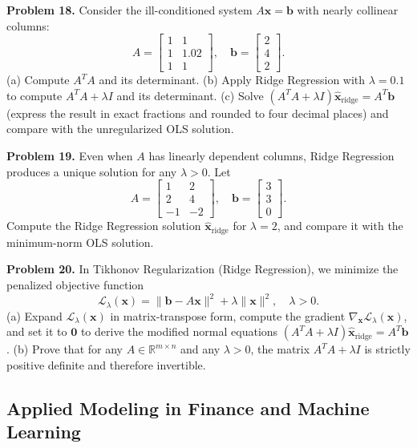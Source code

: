 \documentclass[11pt, letterpaper]{article}
\theoremstyle{definition}
\theoremstyle{remark}
\begin{document}
\textbf{Problem 18.} Consider the ill-conditioned system $A\mathbf{x} = \mathbf{b}$ with nearly collinear columns:
\[
A = \begin{bmatrix} 1 & 1 \\ 1 & 1.02 \\ 1 & 1 \end{bmatrix}, \quad \mathbf{b} = \begin{bmatrix} 2 \\ 4 \\ 2 \end{bmatrix}.
\]
(a) Compute $A^T A$ and its determinant. (b) Apply Ridge Regression with $\lambda = 0.1$ to compute $A^T A + \lambda I$ and its determinant. (c) Solve $(A^T A + \lambda I)\hat{\mathbf{x}}_{\text{ridge}} = A^T \mathbf{b}$ (express the result in exact fractions and rounded to four decimal places) and compare with the unregularized OLS solution.

\textbf{Problem 19.} Even when $A$ has linearly dependent columns, Ridge Regression produces a unique solution for any $\lambda > 0$. Let
\[
A = \begin{bmatrix} 1 & 2 \\ 2 & 4 \\ -1 & -2 \end{bmatrix}, \quad \mathbf{b} = \begin{bmatrix} 3 \\ 3 \\ 0 \end{bmatrix}.
\]
Compute the Ridge Regression solution $\hat{\mathbf{x}}_{\text{ridge}}$ for $\lambda = 2$, and compare it with the minimum-norm OLS solution.

\textbf{Problem 20.} In Tikhonov Regularization (Ridge Regression), we minimize the penalized objective function
\[
\mathcal{L}_{\lambda}(\mathbf{x}) = \|\mathbf{b} - A\mathbf{x}\|^2 + \lambda \|\mathbf{x}\|^2, \quad \lambda > 0.
\]
(a) Expand $\mathcal{L}_{\lambda}(\mathbf{x})$ in matrix-transpose form, compute the gradient $\nabla_{\mathbf{x}} \mathcal{L}_{\lambda}(\mathbf{x})$, and set it to $\mathbf{0}$ to derive the modified normal equations $(A^T A + \lambda I)\hat{\mathbf{x}}_{\text{ridge}} = A^T \mathbf{b}$. (b) Prove that for any $A \in \mathbb{R}^{m \times n}$ and any $\lambda > 0$, the matrix $A^T A + \lambda I$ is strictly positive definite and therefore invertible.

\subsection{Applied Modeling in Finance and Machine Learning}
\end{document}
